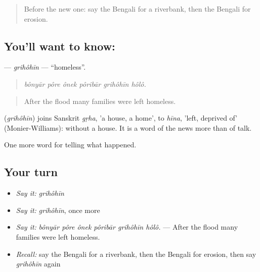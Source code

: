 \label{lesson:BN-C290-grihohin}



\begin{quote}
Before the new one: say the Bengali for a riverbank, then the Bengali for erosion.
\end{quote}

\subsection*{You'll want to know: }
\textbf{} — \emph{grihôhīn} — \textquotedblleft{}homeless\textquotedblright{}.

\begin{quote}
     
\end{quote}

\begin{quote}
\emph{bônyār pôre ônek pôribār grihôhīn hôlô.}
\end{quote}

\begin{quote}
After the flood many families were left homeless.
\end{quote}

\begin{cousinweb}
\textbf{} (\emph{grihôhīn}) joins Sanskrit \emph{gṛha}, 'a house, a home', to \emph{hīna}, 'left, deprived of' (Monier-Williams): without a house. It is a word of the news more than of talk.
\end{cousinweb}

\begin{grammarlens}[title={What you've built}]
One more word for telling what happened.
\end{grammarlens}

\subsection*{Your turn}
\begin{itemize}
\raggedright
  \item \emph{Say it:} \emph{grihôhīn}
  \item \emph{Say it:} \emph{grihôhīn}, once more
  \item \emph{Say it:} \emph{bônyār pôre ônek pôribār grihôhīn hôlô.} — After the flood many families were left homeless.
  \item \emph{Recall:} say the Bengali for a riverbank, then the Bengali for erosion, then say \emph{grihôhīn} again
\end{itemize}

